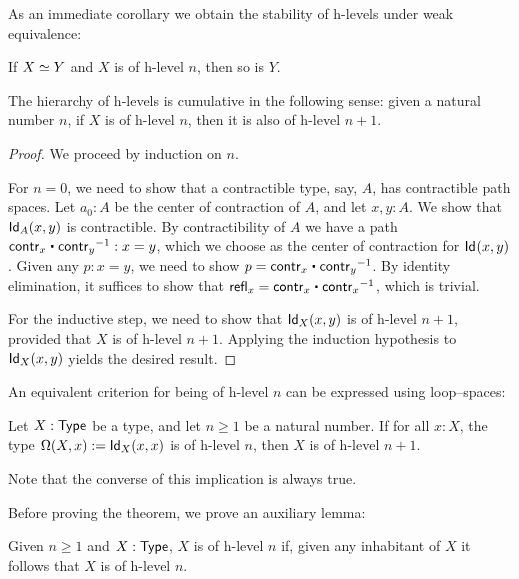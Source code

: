 As an immediate corollary we obtain the stability of h-levels under weak equivalence:

\begin{cor}\label{cor:preservation_hlevels_weq}
 If $\eqv{X}{Y}$ and $X$ is of h-level $n$, then so is $Y$.
\end{cor}

\begin{thm}\label{thm:hlevel_cumulative}
 The hierarchy of h-levels is cumulative in the following sense:
   given a natural number $n$, if $X$ is of h-level $n$, then it is also of h-level $n+1$.
\end{thm}

\begin{proof}
 We proceed by induction on $n$.

 For $n = 0$, we need to show that a contractible type, say, $A$, has contractible path spaces.
       Let $a_0: A$ be the center of contraction of $A$, and let $x, y : A$. We show that $\idtype[A]{x}{y}$
       is contractible.
       By contractibility of $A$ we have a path $\contr_x \ct \opp{\contr_y} : x = y$, which we choose as
       the center of contraction for $\idtype{x}{y}$.
       Given any $p : x = y$, we need to show $p = \contr_x \ct \opp{\contr_y}$.
           By identity elimination, it suffices to show that
        $\refl{x} = \contr_x \ct \opp{\contr_x}$, which is trivial.

 For the inductive step, we need to show that $\idtype[X]{x}{y}$ is of h-level $n+1$, provided
          that $X$ is of h-level $n+1$. Applying the induction hypothesis to $\idtype[X]{x}{y}$
         yields the desired result.
\end{proof}

An equivalent criterion for being of h-level $n$ can be expressed using loop--spaces:

\begin{thm}\label{thm:hlevel_loops}
 Let $X : \type$ be a type, and let $n\geq 1$ be a natural number.
  If for all $x : X$, the type $\Omega(X, x) := \idtype[X]{x}{x}$ is of h-level $n$,
       then $X$ is of h-level $n+1$.
\end{thm}

Note that the converse of this implication is always true.

Before proving the theorem, we prove an auxiliary lemma:

\begin{lem}\label{lem:hlevel_if_inhab_hlevel}
 Given $n \geq 1$ and $X : \type$, $X$ is of h-level $n$ if, given any inhabitant of $X$ it follows that $X$ is
   of h-level $n$.
\end{lem}

